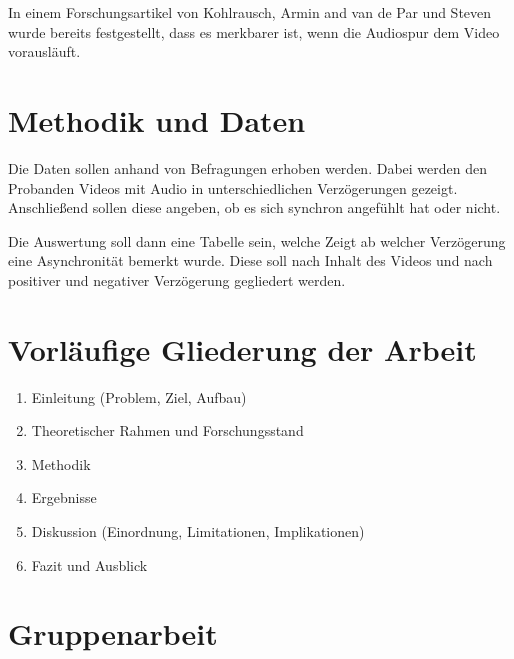 \documentclass[11pt,a4paper]{article}
\begin{document}

In einem Forschungsartikel von Kohlrausch, Armin and van de Par und Steven wurde bereits festgestellt, dass es
merkbarer ist, wenn die Audiospur dem Video vorausläuft. \cite{kohlrausch2000experimente}

\cite{grant2003discrimination}

\cite{lutzky2004guideline}

\section{Methodik und Daten}

Die Daten sollen anhand von Befragungen erhoben werden.
Dabei werden den Probanden Videos mit Audio in unterschiedlichen Verzögerungen gezeigt.
Anschließend sollen diese angeben, ob es sich synchron angefühlt hat oder nicht.

Die Auswertung soll dann eine Tabelle sein, welche Zeigt ab welcher Verzögerung eine Asynchronität bemerkt wurde.
Diese soll nach Inhalt des Videos und nach positiver und negativer Verzögerung gegliedert werden.


\section{Vorläufige Gliederung der Arbeit}

\begin{enumerate}[leftmargin=1cm,label=\arabic*.]
    \item Einleitung (Problem, Ziel, Aufbau)
    \item Theoretischer Rahmen und Forschungsstand
    \item Methodik
    \item Ergebnisse
    \item Diskussion (Einordnung, Limitationen, Implikationen)
    \item Fazit und Ausblick
\end{enumerate}

\section{Gruppenarbeit}
\end{document}
